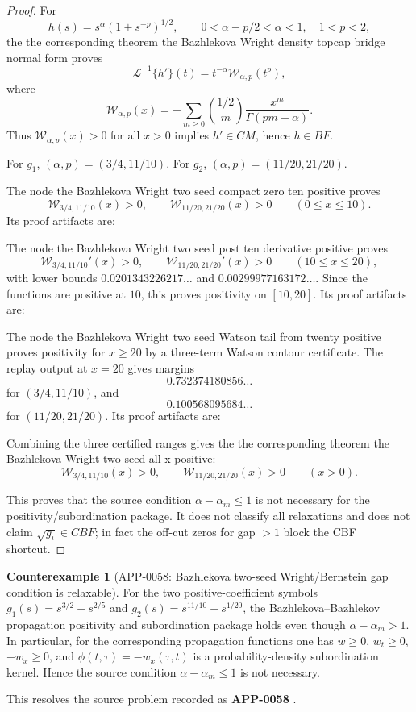 \documentclass[11pt]{article}
\numberwithin{equation}{section}
\theoremstyle{definition}
\newtheorem{counterexample}[theorem]{Counterexample}
\theoremstyle{remark}
\newcommand{\1}{\mathbf 1}
\begin{document}
\begin{proof}
For
\[
h(s)=s^\alpha(1+s^{-p})^{1/2},\qquad 0<\alpha-p/2<\alpha<1,\quad 1<p<2,
\]
the the corresponding theorem the Bazhlekova Wright density topcap bridge normal form proves
\[
\mathcal L^{-1}\{h'\}(t)=t^{-\alpha}\mathcal W_{\alpha,p}(t^p),
\]
where
\[
\mathcal W_{\alpha,p}(x)=
-\sum_{m\ge0}\binom{1/2}{m}\frac{x^m}{\Gamma(pm-\alpha)}.
\]
Thus \(\mathcal W_{\alpha,p}(x)>0\) for all \(x>0\) implies \(h'\in CM\), hence \(h\in BF\).

For \(g_1\), \((\alpha,p)=(3/4,11/10)\). For \(g_2\), \((\alpha,p)=(11/20,21/20)\).

The node the Bazhlekova Wright two seed compact zero ten positive proves
\[
\mathcal W_{3/4,11/10}(x)>0,\qquad
\mathcal W_{11/20,21/20}(x)>0
\qquad(0\le x\le10).
\]
Its proof artifacts are:

The node the Bazhlekova Wright two seed post ten derivative positive proves
\[
\mathcal W_{3/4,11/10}'(x)>0,\qquad
\mathcal W_{11/20,21/20}'(x)>0
\qquad(10\le x\le20),
\]
with lower bounds \(0.0201343226217\ldots\) and \(0.00299977163172\ldots\). Since the functions are positive at \(10\), this proves positivity on \([10,20]\). Its proof artifacts are:

The node the Bazhlekova Wright two seed Watson tail from twenty positive proves positivity for \(x\ge20\) by a three-term Watson contour certificate. The replay output at \(x=20\) gives margins
\[
0.732374180856\ldots
\]
for \((3/4,11/10)\), and
\[
0.100568095684\ldots
\]
for \((11/20,21/20)\). Its proof artifacts are:

Combining the three certified ranges gives the the corresponding theorem the Bazhlekova Wright two seed all x positive:
\[
\mathcal W_{3/4,11/10}(x)>0,\qquad
\mathcal W_{11/20,21/20}(x)>0
\qquad(x>0).
\]

This proves that the source condition \(\alpha-\alpha_m\le1\) is not necessary for the positivity/subordination package. It does not classify all relaxations and does not claim \(\sqrt{g_i}\in CBF\); in fact the off-cut zeros for gap \(>1\) block the CBF shortcut.
\end{proof}

\begin{counterexample}[APP-0058: Bazhlekova two-seed Wright/Bernstein gap condition is relaxable]
\label{res:bazhlekova-twoseed-sourcepackage-relaxation}
For the two positive-coefficient symbols \(g_1(s)=s^{3/2}+s^{2/5}\) and \(g_2(s)=s^{11/10}+s^{1/20}\), the Bazhlekova--Bazhlekov propagation positivity and subordination package holds even though \(\alpha-\alpha_m>1\). In particular, for the corresponding propagation functions one has \(w\ge0\), \(w_t\ge0\), \(-w_x\ge0\), and \(\phi(t,\tau)=-w_x(\tau,t)\) is a probability-density subordination kernel. Hence the source condition \(\alpha-\alpha_m\le1\) is not necessary.



This resolves the source problem recorded as \textbf{APP-0058} \cite{app-app-0058-source}.
\end{counterexample}
\end{document}
